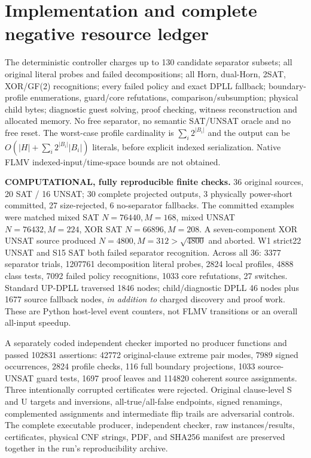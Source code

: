 \documentclass[11pt]{article}
\begin{document}
\section{Implementation and complete negative resource ledger}
The deterministic controller charges up to 130 candidate separator subsets; all original literal probes and failed decompositions; all Horn, dual-Horn, 2SAT, XOR/GF(2) recognitions; every failed policy and exact DPLL fallback; boundary-profile enumerations, guard/core refutations, comparison/subsumption; physical child bytes; diagnostic guest solving, proof checking, witness reconstruction and allocated memory. No free separator, no semantic SAT/UNSAT oracle and no free reset. The worst-case profile cardinality is $\sum_i2^{|B_i|}$ and the output can be $O(|H|+\sum_i2^{|B_i|}|B_i|)$ literals, before explicit indexed serialization. Native FLMV indexed-input/time-space bounds are not obtained.

\noindent\textbf{COMPUTATIONAL, fully reproducible finite checks.} 36 original sources, 20 SAT / 16 UNSAT; 30 complete projected outputs, 3 physically power-short committed, 27 size-rejected, 6 no-separator fallbacks. The committed examples were matched mixed SAT $N=76440,M=168$, mixed UNSAT $N=76432,M=224$, XOR SAT $N=66896,M=208$. A seven-component XOR UNSAT source produced $N=4800,M=312>\sqrt{4800}$ and aborted. W1 strict22 UNSAT and S15 SAT both failed separator recognition. Across all 36: 3377 separator trials, 1207761 decomposition literal probes, 2824 local profiles, 4888 class tests, 7092 failed policy recognitions, 1033 core refutations, 27 switches. Standard UP-DPLL traversed 1846 nodes; child/diagnostic DPLL 46 nodes plus 1677 source fallback nodes, \emph{in addition to} charged discovery and proof work. These are Python host-level event counters, not FLMV transitions or an overall all-input speedup.

\noindent A separately coded independent checker imported no producer functions and passed 102831 assertions: 42772 original-clause extreme pair modes, 7989 signed occurrences, 2824 profile checks, 116 full boundary projections, 1033 source-UNSAT guard tests, 1697 proof leaves and 114820 coherent source assignments. Three intentionally corrupted certificates were rejected. Original clause-level S and U targets and inversions, all-true/all-false endpoints, signed renamings, complemented assignments and intermediate flip trails are adversarial controls. The complete executable producer, independent checker, raw instances/results, certificates, physical CNF strings, PDF, and SHA256 manifest are preserved together in the run's reproducibility archive.
\end{document}
